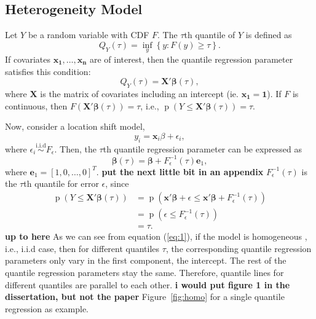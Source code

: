 \documentclass[12pt]{article}
\DeclareMathOperator{\pr}{p}
\begin{document}
\subsection{Heterogeneity Model}
Let $Y$ be a random variable with CDF $F$.  The $\tau$th quantile
of $Y$ is defined as 
\begin{displaymath}
  Q_Y(\tau) = \underset{y}{\inf} \left\{ y: F(y) \ge \tau \right\}.
\end{displaymath}
If covariates $\bm{x_1, \ldots, x_n}$ are of interest,
then the quantile regression parameter satisfies this
condition: 
\begin{displaymath}
  Q_Y(\tau) = \bm{X'\beta}(\tau),
\end{displaymath}
where $\bm{X}$ is the matrix of covariates including 
an intercept (ie. $\bm{x_1}=
\bm{1}$). 
If $F$ is continuous, then
$F(\bm{X'\beta}(\tau)) = \tau$, i.e., $\pr(Y \le \bm{X'\beta}(\tau)) =
\tau$. 

Now, consider a location shift model, 
\begin{displaymath}
  y_i = \bm{x}_i\beta + \epsilon_i, 
\end{displaymath}
where $\epsilon_i \stackrel{\text{i.i.d}}{\sim} F_{\epsilon}$. Then, the $\tau$th
quantile regression parameter can be expressed as 
\begin{equation}
  \label{eq:1}
  \bm{\beta}(\tau) = \bm{\beta} + F^{-1}_{\epsilon}(\tau) \bm{e}_1,
\end{equation}
where $\bm{e}_1 = [1, 0, \ldots, 0]^T$.  {\bf put the next little bit
  in an appendix}  $F^{-1}_{\epsilon}(\tau)$ is
the $\tau$th quantile for error $\epsilon$, since 
\begin{align*}
  \pr (Y \le \bm{X'\beta}(\tau)) & = \pr \left( \bm{x'\beta} + \epsilon
    \le \bm{x'\beta} + F^{-1}_{\epsilon}(\tau) \right) \\
  & = \pr (\epsilon \le F^{-1}_{\epsilon}(\tau)) \\
  & = \tau. 
\end{align*}
{\bf up to here}
As we can see from equation (\ref{eq:1}), if the model is homogeneous
, i.e., i.i.d case, then for different quantiles $\tau$, the
corresponding quantile regression parameters only vary in the
first component, the intercept. The rest of the quantile regression
parameters stay the same. Therefore, quantile lines for different
quantiles are parallel to each other. 
{\bf i would put figure 1 in the dissertation, but not the paper}
Figure~\ref{fig:homo} for a single quantile regression as example. 
\end{document}
